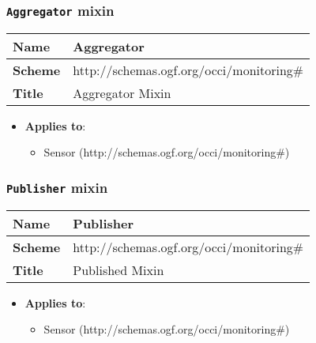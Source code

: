  
\subsubsection{\texttt{Aggregator} mixin}
\begin{center}
\begin{tabular}{|l|l|}
  \hline
  \textbf{Name} & Aggregator \\
  \hline  
  \textbf{Scheme} & http://schemas.ogf.org/occi/monitoring\# \\
  \hline
  \textbf{Title} & Aggregator Mixin \\
  \hline
\end{tabular}
\end{center}
\begin{itemize}
\item \textbf{Applies to}:
\begin{itemize}
	\item Sensor (http://schemas.ogf.org/occi/monitoring\#)
\end{itemize}
\end{itemize} 



 
\subsubsection{\texttt{Publisher} mixin}
\begin{center}
\begin{tabular}{|l|l|}
  \hline
  \textbf{Name} & Publisher \\
  \hline  
  \textbf{Scheme} & http://schemas.ogf.org/occi/monitoring\# \\
  \hline
  \textbf{Title} & Published Mixin \\
  \hline
\end{tabular}
\end{center}
\begin{itemize}
\item \textbf{Applies to}:
\begin{itemize}
	\item Sensor (http://schemas.ogf.org/occi/monitoring\#)
\end{itemize}
\end{itemize} 



 
